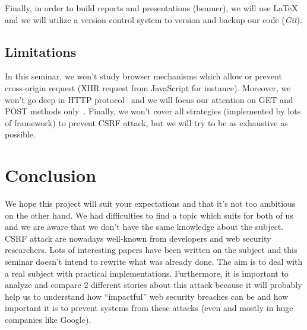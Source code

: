 \documentclass[a4paper,11pt]{article}
\begin{document}
  Finally, in order to build reports and presentations (beamer), we will use \LaTeX{} and we will utilize a version control system to 
  version and backup our code (\textit{Git}).
  
  \subsection{Limitations}

  In this seminar, we won't study browser mechanisms which allow or prevent cross-origin 
  request (XHR request from JavaScript for instance). Moreover, we won't go deep in HTTP 
  protocol~\cite{rfc2616} and we will focus our attention on GET and POST methods 
  only~\cite[5.1.1]{rfc2616}. Finally, we won't cover all strategies (implemented by lots 
  of framework) to prevent CSRF attack, but we will try to be as exhaustive as possible.
  
  \section{Conclusion}
  
  We hope this project will suit your expectations and that it's not too ambitious on the 
  other hand. We had difficulties to find a topic which suits for both of us and we are 
  aware that we don't have the same knowledge about the subject. CSRF attack are nowadays 
  well-known from developers and web security researchers. Lots of interesting papers have 
  been written on the subject and this seminar doesn't intend to rewrite what was already 
  done. The aim is to deal with a real subject with practical implementations. Furthermore, 
  it is important to analyze and compare 2 different stories about this attack because it 
  will probably help us to understand how ``impactful'' web security breaches can be and how 
  important it is to prevent systems from these attacks (even and mostly in huge companies 
  like Google).
  


\end{document}
